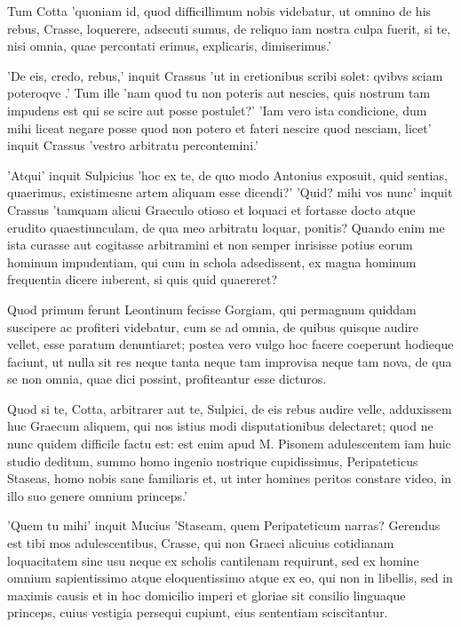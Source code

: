  Tum Cotta 'quoniam id, quod difficillimum nobis videbatur, ut omnino de his rebus, Crasse, loquerere, adsecuti sumus, de reliquo iam nostra culpa fuerit, si te, nisi omnia, quae percontati erimus, explicaris, dimiserimus.'

 'De eis, credo, rebus,' inquit Crassus 'ut in cretionibus scribi solet: qvibvs sciam poteroqve .' Tum ille 'nam quod tu non poteris aut nescies, quis nostrum tam impudens est qui se scire aut posse postulet?' 'Iam vero ista condicione, dum mihi liceat negare posse quod non potero et fateri nescire quod nesciam, licet' inquit Crassus 'vestro arbitratu percontemini.'

 'Atqui' inquit Sulpicius 'hoc ex te, de quo modo Antonius exposuit, quid sentias, quaerimus, existimesne artem aliquam esse dicendi?' 'Quid? mihi vos nunc' inquit Crassus 'tamquam alicui Graeculo otioso et loquaci et fortasse docto atque erudito quaestiunculam, de qua meo arbitratu loquar, ponitis? Quando enim me ista curasse aut cogitasse arbitramini et non semper inrisisse potius eorum hominum impudentiam, qui cum in schola adsedissent, ex magna hominum frequentia dicere iuberent, si quis quid quaereret?

 Quod primum ferunt Leontinum fecisse Gorgiam, qui permagnum quiddam suscipere ac profiteri videbatur, cum se ad omnia, de quibus quisque audire vellet, esse paratum denuntiaret; postea vero vulgo hoc facere coeperunt hodieque faciunt, ut nulla sit res neque tanta neque tam improvisa neque tam nova, de qua se non omnia, quae dici possint, profiteantur esse dicturos.

 Quod si te, Cotta, arbitrarer aut te, Sulpici, de eis rebus audire velle, adduxissem huc Graecum aliquem, qui nos istius modi disputationibus delectaret; quod ne nunc quidem difficile factu est: est enim apud M. Pisonem adulescentem iam huic studio deditum, summo homo ingenio nostrique cupidissimus, Peripateticus Staseas, homo nobis sane familiaris et, ut inter homines peritos constare video, in illo suo genere omnium princeps.'

 'Quem tu mihi' inquit Mucius 'Staseam, quem Peripateticum narras? Gerendus est tibi mos adulescentibus, Crasse, qui non Graeci alicuius cotidianam loquacitatem sine usu neque ex scholis cantilenam requirunt, sed ex homine omnium sapientissimo atque eloquentissimo atque ex eo, qui non in libellis, sed in maximis causis et in hoc domicilio imperi et gloriae sit consilio linguaque princeps, cuius vestigia persequi cupiunt, eius sententiam sciscitantur.

